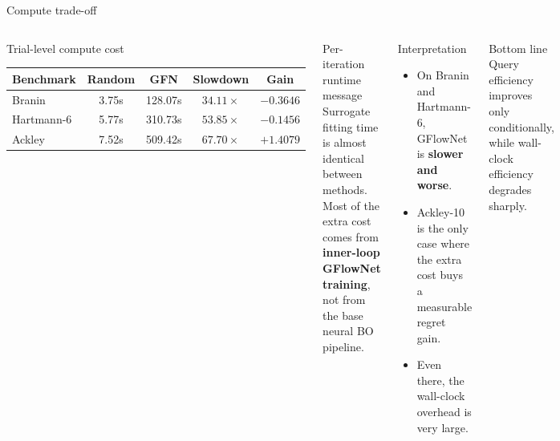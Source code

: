 \documentclass[aspectratio=169]{beamer}
\begin{document}
\begin{frame}{Compute trade-off}
\vspace{-0.55em}
\begin{columns}[T,onlytextwidth]
\begin{minipage}[t][0.82\textheight]{\linewidth}\vspace{0pt}
  \begin{cardW}{Trial-level compute cost}
  \centering
  \begin{tabular}{lcccc}
  \toprule
  Benchmark & Random & GFN & Slowdown & Gain \\
  \midrule
  Branin & 3.75s & 128.07s & $34.11\times$ & $-0.3646$ \\
  Hartmann-6 & 5.77s & 310.73s & $53.85\times$ & $-0.1456$ \\
  Ackley & 7.52s & 509.42s & $67.70\times$ & $+1.4079$ \\
  \bottomrule
  \end{tabular}
  \end{cardW}

  \vfill

  \begin{card}{Per-iteration runtime message}
  Surrogate fitting time is almost identical between methods. Most of the extra cost comes from \textbf{inner-loop GFlowNet training}, not from the base neural BO pipeline.
  \end{card}
\end{minipage}

\begin{minipage}[t][0.82\textheight]{\linewidth}\vspace{0pt}
  \begin{cardA}{Interpretation}
  \begin{itemize}
    \item On Branin and Hartmann-6, GFlowNet is \textbf{slower and worse}.
    \item Ackley-10 is the only case where the extra cost buys a measurable regret gain.
    \item Even there, the wall-clock overhead is very large.
  \end{itemize}
  \end{cardA}

  \vfill

  \begin{cardG}{Bottom line}
  Query efficiency improves only conditionally, while wall-clock efficiency degrades sharply.
  \end{cardG}
\end{minipage}
\end{columns}
\end{frame}
\end{document}
